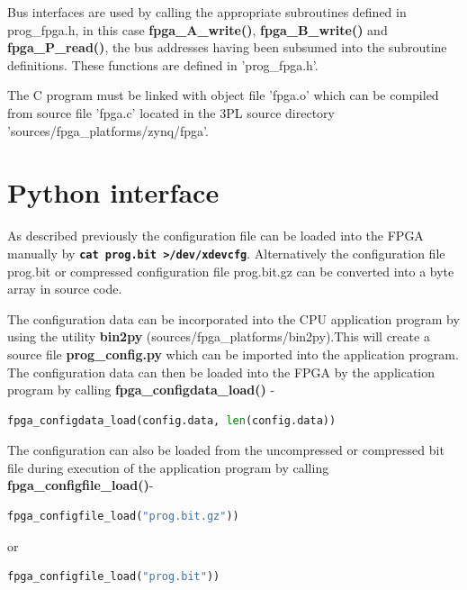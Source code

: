         Bus interfaces are used by calling the appropriate subroutines defined in prog\_fpga.h,
        in this case {\bf fpga\_A\_write()}, {\bf fpga\_B\_write()} and {\bf
        fpga\_P\_read()}, the bus addresses having been subsumed into the subroutine
        definitions. These functions are defined in 'prog\_fpga.h'.
        
        The C program must be linked with object file 'fpga.o' which can be
        compiled from source file 'fpga.c' located in the 3PL source directory
        'sources/fpga\_platforms/zynq/fpga'.



    \section{Python interface}

    
        As described previously the configuration file can be loaded into the
        FPGA manually by {\bf \verb'cat prog.bit >/dev/xdevcfg'}. Alternatively
        the configuration file prog.bit or compressed configuration file
        prog.bit.gz  can be converted into a byte array in source code.
    
        The configuration data can be incorporated into the CPU application
        program by using the utility {\bf bin2py} (sources/fpga\_platforms/bin2py).This
        will create a source file {\bf prog\_config.py} which can be
        imported into the application program.
        The configuration data can then be loaded into the FPGA by the
        application program by calling {\bf fpga\_configdata\_load()} -
        \begin{lstlisting}[gobble=4, language=Python]
            fpga_configdata_load(config.data, len(config.data))
        \end{lstlisting}
        
        The configuration can also be loaded from the uncompressed or compressed
        bit file during execution of the application program by calling {\bf
        fpga\_configfile\_load()}-
        \begin{lstlisting}[gobble=4, language=Python]
            fpga_configfile_load("prog.bit.gz"))
        \end{lstlisting}
        or
        \begin{lstlisting}[gobble=4, language=Python]
            fpga_configfile_load("prog.bit"))
        \end{lstlisting}
        

